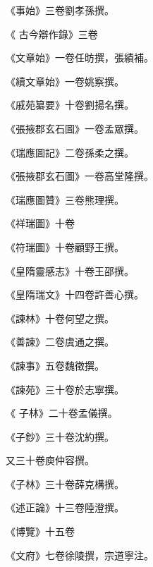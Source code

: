 \begin{pinyinscope}
 《事始》三卷劉孝孫撰。



 《
 古今辯作錄》三卷



 《文章始》一卷任昉撰，張績補。



 《續文章始》一卷姚察撰。



 《戚苑纂要》十卷劉揚名撰。



 《張掖郡玄石圖》一卷孟眾撰。



 《瑞應圖記》二卷孫柔之撰。



 《張掖郡玄石圖》一卷高堂隆撰。



 《瑞應圖贊》三卷熊理撰。



 《祥瑞圖》十卷



 《符瑞圖》十卷顧野王撰。



 《皇隋靈感志》十卷王邵撰。



 《皇隋瑞文》十四卷許善心撰。



 《諫林》十卷何望之撰。



 《善諫》二卷虞通之撰。



 《諫事》五卷魏徵撰。



 《諫苑》三十卷於志寧撰。



 《
 子林》二十卷孟儀撰。



 《子鈔》三十卷沈約撰。



 又三十卷庾仲容撰。



 《子林》三十卷薛克構撰。



 《述正論》十三卷陸澄撰。



 《博覽》十五卷



 《文府》七卷徐陵撰，宗道寧注。




\end{pinyinscope}

